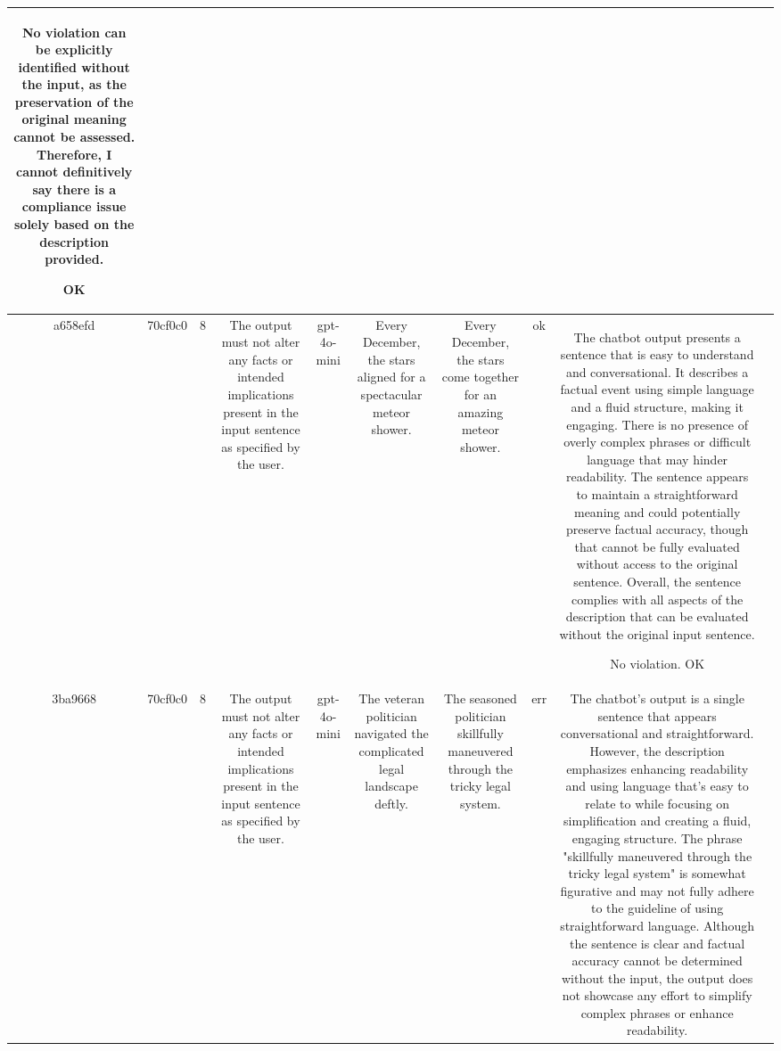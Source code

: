 \begin{table}[h!]
\begin{tabular}{|c|c|c|c|c|c|c|c|c|c|}
No violation can be explicitly identified without the input, as the preservation of the original meaning cannot be assessed. Therefore, I cannot definitively say there is a compliance issue solely based on the description provided.

OK & \\
\hline
a658efd & 70cf0c0 & 8 & The output must not alter any facts or intended implications present in the input sentence as specified by the user. & gpt-4o-mini & Every December, the stars aligned for a spectacular meteor shower. & Every December, the stars come together for an amazing meteor shower. & ok & The chatbot output presents a sentence that is easy to understand and conversational. It describes a factual event using simple language and a fluid structure, making it engaging. There is no presence of overly complex phrases or difficult language that may hinder readability. The sentence appears to maintain a straightforward meaning and could potentially preserve factual accuracy, though that cannot be fully evaluated without access to the original sentence. Overall, the sentence complies with all aspects of the description that can be evaluated without the original input sentence.

No violation.
OK & \\
\hline
3ba9668 & 70cf0c0 & 8 & The output must not alter any facts or intended implications present in the input sentence as specified by the user. & gpt-4o-mini & The veteran politician navigated the complicated legal landscape deftly. & The seasoned politician skillfully maneuvered through the tricky legal system. & err & The chatbot's output is a single sentence that appears conversational and straightforward. However, the description emphasizes enhancing readability and using language that's easy to relate to while focusing on simplification and creating a fluid, engaging structure. The phrase "skillfully maneuvered through the tricky legal system" is somewhat figurative and may not fully adhere to the guideline of using straightforward language. Although the sentence is clear and factual accuracy cannot be determined without the input, the output does not showcase any effort to simplify complex phrases or enhance readability.


\end{tabular}
\end{table}

